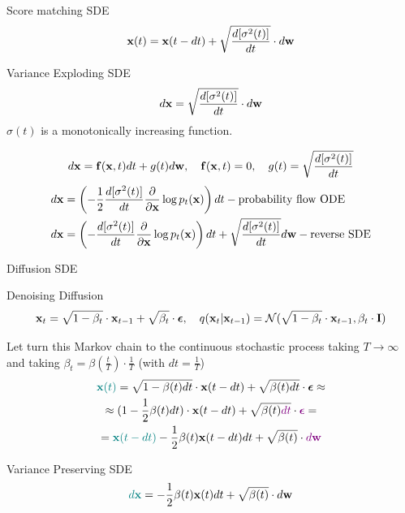 \begin{frame}{Score matching SDE}
	\vspace{-0.3cm}
	\[
		\mathbf{x}(t) = \mathbf{x}(t - dt) + \sqrt{\frac{ d [\sigma^2(t)]}{dt}} \cdot d \mathbf{w}
	\]
	\vspace{-0.5cm}
	\begin{block}{Variance Exploding SDE}
		\vspace{-0.3cm}
		\[
			d \mathbf{x} = \sqrt{\frac{ d [\sigma^2(t)]}{dt}} \cdot d \mathbf{w}
		\]
		$\sigma(t)$ is a monotonically increasing function.
	\end{block}
	\vspace{-0.7cm}
	\[
		d\mathbf{x} = \mathbf{f}(\mathbf{x}, t) dt + g(t) d \mathbf{w}, \quad \mathbf{f}(\mathbf{x}, t) = 0, \quad g(t) = \sqrt{\frac{ d [\sigma^2(t)]}{dt}} 
	\]
	\vspace{-0.5cm}
	\begin{align*}
		d\mathbf{x} &= \left(-\frac{1}{2} \frac{ d [\sigma^2(t)]}{dt} \frac{\partial}{\partial \mathbf{x}} \log p_t(\mathbf{x}) \right) dt - \text{probability flow ODE} \\
		d\mathbf{x} &= \left(- \frac{ d [\sigma^2(t)]}{dt} \frac{\partial}{\partial \mathbf{x}}\log p_t(\mathbf{x})\right) dt + \sqrt{\frac{ d [\sigma^2(t)]}{dt}}  d \mathbf{w} - \text{reverse SDE}
	\end{align*}
\end{frame}
\begin{frame}{Diffusion SDE}
	\begin{block}{Denoising Diffusion}
		\vspace{-0.5cm}
		\[
			\mathbf{x}_t = \sqrt{1 - \beta_t} \cdot \mathbf{x}_{t - 1} + \sqrt{\beta_t} \cdot \boldsymbol{\epsilon}, \quad q(\mathbf{x}_t | \mathbf{x}_{t-1}) = \mathcal{N}(\sqrt{1 - \beta_t} \cdot \mathbf{x}_{t-1}, \beta_t \cdot \mathbf{I})
		\]
		\vspace{-0.5cm}
	\end{block}
	Let turn this Markov chain to the continuous stochastic process taking $T \rightarrow \infty$ and taking $\beta_t = \beta(\frac{t}{T}) \cdot \frac{1}{T}$ (with $dt = \frac{1}{T}$)
	\begin{multline*}
		{\color{teal}\mathbf{x}(t)} = \sqrt{1 - \beta(t) dt} \cdot \mathbf{x}(t - dt) + \sqrt{\beta(t)dt} \cdot \boldsymbol{\epsilon} \approx \\
		\approx (1 - \frac{1}{2} \beta(t) dt) \cdot \mathbf{x}(t - dt) + \sqrt{\beta(t){\color{violet}dt}} \cdot {\color{violet}\boldsymbol{\epsilon}} = \\
		= {\color{teal}\mathbf{x}(t - dt)} - \frac{1}{2} \beta(t) \mathbf{x}(t - dt) dt  + \sqrt{\beta(t)} \cdot {\color{violet}d \mathbf{w}}
	\end{multline*}
	\vspace{-0.5cm}
	\begin{block}{Variance Preserving SDE}
		\vspace{-0.3cm}
		\[
			{\color{teal}d \mathbf{x}} = - \frac{1}{2} \beta(t) \mathbf{x}(t) dt + \sqrt{\beta(t)} \cdot d \mathbf{w}
		\]
	\end{block}
\end{frame}
